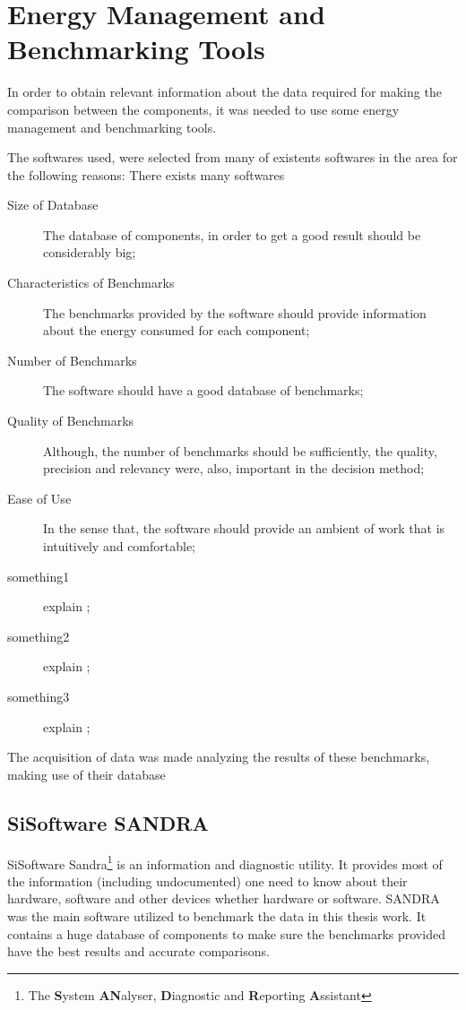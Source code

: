 \section{Energy Management and Benchmarking Tools} \label{sec3:energy_management_tools}
    In order to obtain relevant information about the data required for making the comparison between the components, it was needed to use some energy management and benchmarking tools. 
    
    The softwares used, were selected from many of existents softwares in the area for the following reasons:
    There exists many softwares
\begin{description}
	\item[Size of Database] The database of components, in order to get a good result should be considerably big;
	\item[Characteristics of Benchmarks] The benchmarks provided by the software should provide information about the energy consumed for each component;
	\item[Number of Benchmarks] The software should have a good database of benchmarks;
	\item[Quality of Benchmarks] Although, the number of benchmarks should be sufficiently, the quality, precision and relevancy were, also, important in the decision method;
	\item[Ease of Use] In the sense that, the software should provide an ambient of work that is intuitively and comfortable;
	\item[something1] explain ;%
	\item[something2] explain ;%
	\item[something3] explain ;%
\end{description}
    
    The acquisition of data was made analyzing the results of these benchmarks, making use of their database

    \subsection{SiSoftware SANDRA} \label{sec3:sandra}

    SiSoftware Sandra\footnote{The \textbf{S}ystem \textbf{AN}alyser, \textbf{D}iagnostic and \textbf{R}eporting \textbf{A}ssistant} is an information and diagnostic utility. It provides most of the information (including undocumented) one need to know about their hardware, software and other devices whether hardware or software.
SANDRA was the main software utilized to benchmark the data in this thesis work. It contains a huge database of components to make sure the benchmarks provided have the best results and accurate comparisons.
    
